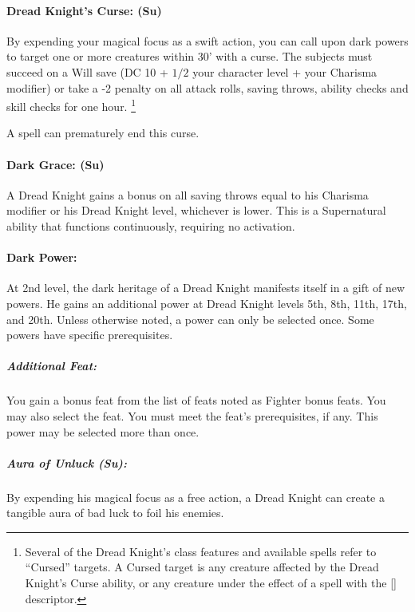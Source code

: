 \paragraph[Dread Knight's Curse]{Dread Knight's Curse: (Su)}
\label{sec:DreadKnightsCurse}
By expending your magical focus as a swift action, you can call upon dark powers to target one or more creatures within 30' with a curse.
The subjects must succeed on a Will save (DC 10 + $1/2$ your character level + your Charisma modifier) or take a -2 penalty on all attack rolls, saving throws, ability checks and skill checks for one hour.
\footnote{Several of the Dread Knight's class features and available spells refer to ``Cursed'' targets. A Cursed target is any creature affected by the Dread Knight's Curse ability, or any creature under the effect of a spell with the [] descriptor.}

A  spell can prematurely end this curse.

\paragraph{Dark Grace: (Su)} A Dread Knight gains a bonus on all saving throws equal to his Charisma modifier or his Dread Knight level, whichever is lower.
This is a Supernatural ability that functions continuously, requiring no activation.

\paragraph{Dark Power:}
At 2nd level, the dark heritage of a Dread Knight manifests itself in a gift of new powers. He gains an additional power at Dread Knight levels 5th, 8th, 11th, 17th, and 20th. Unless otherwise noted, a power can only be selected once. Some powers have specific prerequisites.

\subparagraph{Additional Feat:}
You gain a bonus feat from the list of feats noted as Fighter bonus feats. You may also select the  feat. You must meet the feat's prerequisites, if any.
This power may be selected more than once.

\subparagraph{Aura of Unluck (Su):} 
By expending his magical focus as a free action, a Dread Knight can create a tangible aura of bad luck to foil his enemies. 

